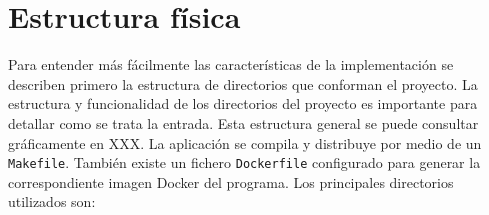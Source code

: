 









\section{Estructura física}

Para entender más fácilmente las características de la implementación se describen primero la estructura de directorios que conforman el proyecto. 
La estructura y funcionalidad de los directorios del proyecto es importante para detallar como se trata la entrada. Esta estructura general se puede consultar gráficamente en XXX. La aplicación se compila y distribuye por medio de un \verb|Makefile|. También existe un fichero \verb|Dockerfile| configurado para generar la correspondiente imagen Docker del programa. Los principales directorios utilizados son:

